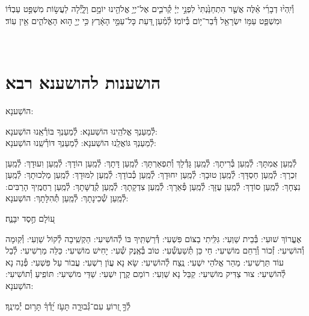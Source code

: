 \documentclass[twoside, openany, parskip=half, 11pt]{book}
\begin{document}
וְ֯יִֽהְי֨וּ דְבָרַ֜י אֵ֗לֶּה אֲשֶׁ֤ר הִתְחַנַּ֙נְתִּי֙ לִפְנֵ֣י יְיָ֔ קְ֯רֹבִ֛ים אֶל־יְיָ֥ אֱלֹהֵ֖ינוּ יוֹמָ֣ם וָלָ֑יְ֯לָה לַעֲשׂ֣וֹת מִשְׁפַּ֣ט עַבְדּ֗וֹ וּמִשְׁפַּ֛ט עַמּ֥וֹ יִשְׂרָאֵ֖ל דְּ֯בַר־י֥וֹם בְּ֯יוֹמֽוֹ׃ לְ֯מַ֗עַן דַּ֚עַת כָּל־עַמֵּ֣י הָאָ֔רֶץ כִּ֥י יְיָ֖ ה֣וּא הָאֱלֹהִ֑ים אֵ֖ין עֽוֹד׃

\vfill
{}\\

\clearpage

\vspace{-1\baselineskip}
\section[הושענות להושענא רבא]{ הושענות להושענא רבא }

\begin{Large}
הוֹשַׁענָא:
\end{Large}


לְ֯מַעַנְךָ אֱלֹהֵֽינוּ הוֹשַׁענָא: לְ֯מַעַנְךָ בּוֹרְ֯אֵֽנוּ הוֹשַׁענָא:\\
לְ֯מַעַנְךָ גּוֹאֲלֵֽנוּ הוֹשַׁענָא: לְ֯מַעַנְךָ דּוֹרְ֯שֵֽׁנוּ הוֹשַׁענָא:

לְ֯מַֽעַן אֲמִתָּךְ: לְ֯מַֽעַן בְּ֯רִיתָךְ: לְ֯מַֽעַן גָּדְ֯לָךְ וְ֯תִפְאַרְתָּךְ: לְ֯מַֽעַן דָּתָךְ: לְ֯מַֽעַן הוֹדָךְ: לְ֯מַֽעַן וִעוּדָךְ: לְ֯מַֽעַן זִכְרָךְ: לְ֯מַֽעַן חַסְדָּךְ: לְ֯מַֽעַן טוּבָךְ: לְ֯מַֽעַן יִחוּדָךְ: לְ֯מַֽעַן כְּ֯בוֹדָךְ: לְ֯מַֽעַן לִמּוּדָךְ: לְ֯מַֽעַן מַלְכוּתָךְ: לְ֯מַֽעַן נִצְחָךְ: לְ֯מַֽעַן סוֹדָךְ: לְ֯מַֽעַן עֻזָּךְ: לְ֯מַֽעַן פְּ֯אֵרָךְ: לְ֯מַֽעַן צִדְקָתָךְ: לְ֯מַֽעַן קְ֯דֻשָּׁתָךְ: לְ֯מַֽעַן רַחֲמֶֽיךָ הָרַבִּים:
לְ֯מַֽעַן שְׁ֯כִינָתָךְ:
לְ֯מַֽעַן תְּ֯הִלָּתָךְ: הוֹשַׁענָא:

ע֭וֹלָם חֶ֣סֶד יִבָּנֶ֑ה׃

אֶעֱרוֹךְ שׁוּעִי: בְּ֯בֵית שַׁוְעִי: גִּלִּֽיתִי בַצּוֹם פִּשְׁעִי: דְּ֯רַשְׁתִּֽיךָ בּוֹ לְ֯הוֹשִׁיעִי: הַקְשִֽׁיבָה לְ֯קוֹל שַׁוְעִי: וְ֯קֽוּמָה וְ֯הוֹשִׁיעִי: זְ֯כוֹר וְ֯רַחֵם מוֹשִׁיעִי: חַי כֵּן תְּ֯שַׁעְשְׁ֯עִי: טוֹב בְּ֯אֶֽנֶק שְׁ֯עִי: יָחִישׁ מוֹשִׁיעִי: כַּלֵּה מַרְשִׁיעִי: לְ֯בַל עוֹד תַּרְשִׁיעִי: מַהֵר אֱלֹהֵי יִשְׁעִי: נֶֽצַח לְ֯הוֹשִׁיעִי: שָׂא נָא עֲוֹן רִשְׁעִי: עֲבוֹר עַל פִּשְׁעִי: פְּ֯נֵה נָא לְ֯הוֹשִׁיעִי: צוּר צַדִּיק מוֹשִׁיעִי: קַבֵּל נָא שַׁוְעִי: רוֹמֵם קֶֽרֶן יִשְׁעִי:
שַׁדַּי מוֹשִׁיעִי:
תּוֹפִֽיעַ וְ֯תוֹשִׁיעִי: הוֹשַׁענָא:

לְ֯ךָ֣ זְ֭רוֹעַ עִם־גְּ֯בוּרָ֑ה תָּעֹ֥ז יָ֝דְ֯ךָ֗ תָּר֥וּם יְ֯מִינֶֽךָ׃
\end{document}
